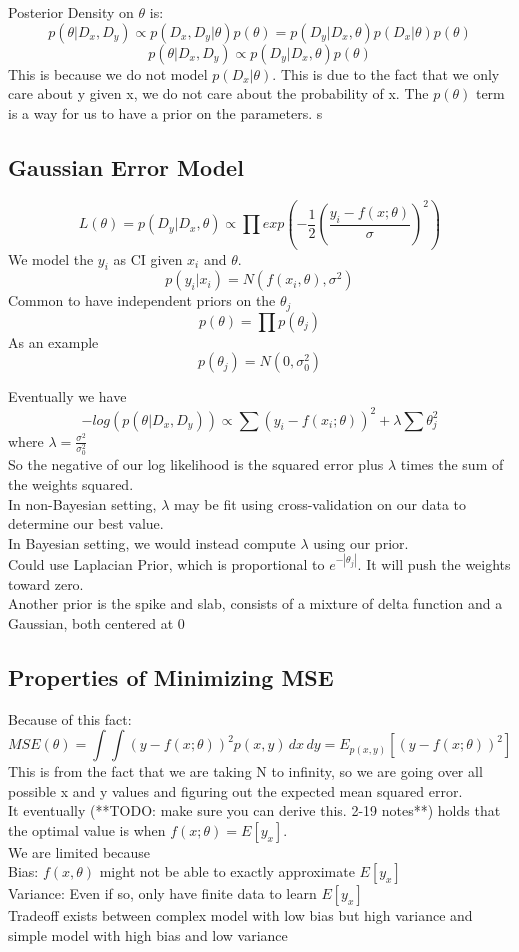 \documentclass[11pt,psfig]{article}
\begin{document}
Posterior Density on $\theta$ is: 
\[
p(\theta|D_x,D_y) \propto p(D_x,D_y|\theta)p(\theta) = p(D_y|D_x,\theta)p(D_x|\theta)p(\theta)
\]
\[
p(\theta|D_x,D_y) \propto p(D_y|D_x,\theta)p(\theta)
\]
This is because we do not model $p(D_x|\theta)$. This is due to the fact that we only care about y given x, we do not care about the probability of x. The $p(\theta)$ term is a way for us to have a prior on the parameters. s

\subsection*{Gaussian Error Model}

\[
L(\theta) = p(D_y|D_x,\theta) \propto \prod{exp(-\frac{1}{2}(\frac{y_i-f(x;\theta)}{\sigma})^2)}
\]
We model the $y_i$ as CI given $x_i$ and $\theta$. 
\[
p(y_i|x_i) = N( f(x_i,\theta), \sigma^2)
\]
Common to have independent priors on the $\theta_j$
\[
p(\theta) = \prod{p(\theta_j)}
\]
As an example
\[
p(\theta_j) = N(0,\sigma_0^2)
\]

Eventually we have
\[
-log(p(\theta|D_x,D_y)) \propto \sum{(y_i - f(x_i;\theta))^2} + \lambda \sum{\theta_j^2}
\]
where $\lambda = \frac{\sigma^2}{\sigma_0^2}$\\
So the negative of our log likelihood is the squared error plus $\lambda$ times the sum of the weights squared. \\
In non-Bayesian setting, $\lambda$ may be fit using cross-validation on our data to determine our best value. 
\\
In Bayesian setting, we would instead compute $\lambda$ using our prior. 
\\
Could use Laplacian Prior, which is proportional to $e^{-|\theta_j|}$. It will push the weights toward zero.\\
Another prior is the spike and slab, consists of a mixture of delta function and a Gaussian, both centered at 0

\subsection*{Properties of Minimizing MSE}

Because of this fact:
\[
MSE(\theta) = \int{\int{(y-f(x;\theta))^2 p(x,y)\,dx}\,dy} = E_{p(x,y)}[(y-f(x;\theta))^2]
\]
This is from the fact that we are taking N to infinity, so we are going over all possible x and y values and figuring out the expected mean squared error. \\
It eventually (**TODO: make sure you can derive this. 2-19 notes**) holds that the optimal value is when $f(x;\theta)=E[y_x]$. \\
We are limited because\\
Bias: $f(x,\theta)$ might not be able to exactly approximate $E[y_x]$\\
Variance: Even if so, only have finite data to learn $E[y_x]$\\
Tradeoff exists between complex model with low bias but high variance and \\
simple model with high bias and low variance
\end{document}
